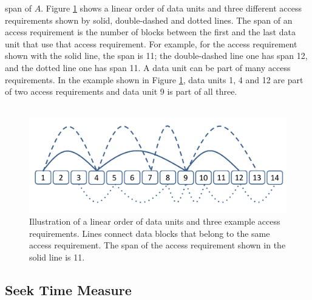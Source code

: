 span of $A$. Figure \ref{singleAR} shows a linear order of data units and three
different access requirements shown by solid, double-dashed and dotted lines.
The span of an access requirement is the number of blocks between the first and
the last data unit that use that access requirement. For example, for the
access requirement shown with the solid line, the span is 11; the double-dashed
line one has span 12, and the dotted line one has span 11. A data unit can be
part of many access requirements. In the example shown in Figure \ref{singleAR}, data units
1, 4 and 12 are part of two access requirements and data unit 9 is part of all
three. \\ \\

\begin{figure}[t]
\centering
\includegraphics[width=\columnwidth]{AccessReqsFigure.pdf}
\caption{Illustration of a linear order of data units and three example access
requirements.  Lines connect data blocks that belong to the same access
requirement.  The span of the access requirement shown in the solid line is 11.
}
\label{singleAR}
\end{figure}



\subsection{Seek Time Measure}

